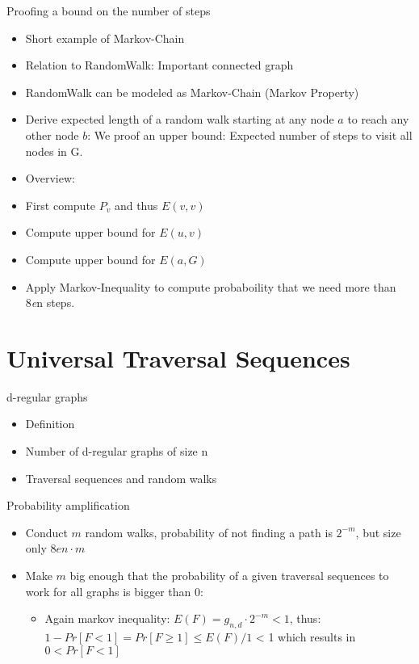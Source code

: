 \begin{frame}{Proofing a bound on the number of steps}

\begin{itemize}
\item
  Short example of Markov-Chain
\item
  Relation to RandomWalk: Important connected graph
\item
  RandomWalk can be modeled as Markov-Chain (Markov Property)
\item
  Derive expected length of a random walk starting at any node $a$ to
  reach any other node $b$: We proof an upper bound: Expected number of
  steps to visit all nodes in G.
\item
  Overview:
\item
  First compute $P_v$ and thus $E(v, v)$
\item
  Compute upper bound for $E(u, v)$
\item
  Compute upper bound for $E(a, G)$
\item
  Apply Markov-Inequality to compute probaboility that we need more than
  8\emph{e}n steps.
\end{itemize}

\end{frame}

\section{Universal Traversal
Sequences}\label{universal-traversal-sequences}

\begin{frame}{d-regular graphs}

\begin{itemize}
\itemsep1pt\parskip0pt
\item
  Definition
\item
  Number of d-regular graphs of size n
\item
  Traversal sequences and random walks
\end{itemize}

\end{frame}

\begin{frame}{Probability amplification}

\begin{itemize}
\itemsep1pt\parskip0pt
\item
  Conduct $m$ random walks, probability of not finding a path is
  $2^{-m}$, but size only $8en \cdot m$
\item
  Make $m$ big enough that the probability of a given traversal
  sequences to work for all graphs is bigger than 0:

  \begin{itemize}
  \itemsep1pt\parskip0pt
  \item
    Again markov inequality: $E(F) = g_{n, d} \cdot 2^{-m} < 1$, thus:
    $1 - Pr[F < 1] = Pr[F \geq 1] \leq E(F) / 1$ \textless{} 1 which
    results in $0 < Pr[F < 1]$
  \end{itemize}
\end{itemize}

\end{frame}
